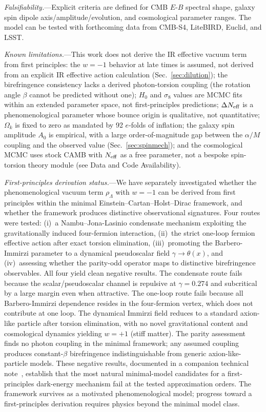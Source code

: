 \documentclass[aps,prd,twocolumn,superscriptaddress,showpacs,preprintnumbers,nofootinbib,longbibliography,floatfix]{revtex4-2}
\newcommand{\Neff}{N_{\rm eff}}
\begin{document}
\textit{Falsifiability.}---Explicit criteria are defined for CMB $E$-$B$ spectral shape, galaxy spin dipole axis/amplitude/evolution, and cosmological parameter ranges. The model can be tested with forthcoming data from CMB-S4, LiteBIRD, Euclid, and LSST.

\textit{Known limitations.}---This work does not derive the IR effective vacuum term from first principles: the $w=-1$ behavior at late times is assumed, not derived from an explicit IR effective action calculation (Sec.~\ref{sec:dilution}); the birefringence consistency lacks a derived photon-torsion coupling (the rotation angle $\beta$ cannot be predicted without one); $H_0$ and $\sigma_8$ values are MCMC fits within an extended parameter space, not first-principles predictions; $\Delta\Neff$ is a phenomenological parameter whose bounce origin is qualitative, not quantitative; $\Omega_k$ is fixed to zero as mandated by 92 $e$-folds of inflation; the galaxy spin amplitude $A_0$ is empirical, with a large order-of-magnitude gap between the $\alpha/M$ coupling and the observed value (Sec.~\ref{sec:spinmech}); and the cosmological MCMC uses stock CAMB with $\Neff$ as a free parameter, not a bespoke spin-torsion theory module (see Data and Code Availability).

\textit{First-principles derivation status.}---We have separately investigated whether the phenomenological vacuum term $\rho_\Lambda$ with $w=-1$ can be derived from first principles within the minimal Einstein--Cartan--Holst--Dirac framework, and whether the framework produces distinctive observational signatures. Four routes were tested: (i)~a Nambu--Jona-Lasinio condensate mechanism exploiting the gravitationally induced four-fermion interaction, (ii)~the strict one-loop fermion effective action after exact torsion elimination, (iii)~promoting the Barbero-Immirzi parameter to a dynamical pseudoscalar field $\gamma\to\theta(x)$, and (iv)~assessing whether the parity-odd operator maps to distinctive birefringence observables. All four yield clean negative results. The condensate route fails because the scalar/pseudoscalar channel is repulsive at $\gamma=0.274$ and subcritical by a large margin even when attractive. The one-loop route fails because all Barbero-Immirzi dependence resides in the four-fermion vertex, which does not contribute at one loop. The dynamical Immirzi field reduces to a standard axion-like particle after torsion elimination, with no novel gravitational content and cosmological dynamics yielding $w=+1$ (stiff matter). The parity assessment finds no photon coupling in the minimal framework; any assumed coupling produces constant-$\beta$ birefringence indistinguishable from generic axion-like-particle models. These negative results, documented in a companion technical note~\cite{Golden2026supplement}, establish that the most natural minimal-model candidates for a first-principles dark-energy mechanism fail at the tested approximation orders. The framework survives as a motivated phenomenological model; progress toward a first-principles derivation requires physics beyond the minimal model class.
\end{document}
